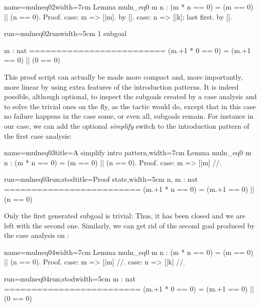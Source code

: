 \begin{coq-left}{name=mulneq02}{width=7cm}
Lemma muln_eq0 m n :
  (m * n == 0) = (m == 0) || (n == 0).
Proof.
case: m => [|m].
  by [].
case: n => [|k]; last first.
  by [].
\end{coq-left}
\begin{coqout-right}{run=mulneq02run}{width=5cm}
1 subgoal

m : nat
=========================
(m.+1 * 0 == 0) =
  (m.+1 == 0) || (0 == 0)
\end{coqout-right}

This proof script can actually be made more compact and, more
importantly, more linear by using extra features of the introduction
patterns. It is indeed possible, although optional, to
inspect the subgoals created by a case analysis and to solve the
trivial ones on the fly, as the  tactic would do, except that
in this case no failure happens in the case some, or even all,
subgoals remain. For instance in our case,
we can add the optional \C{//} \emph{simplify} switch to the
introduction pattern of the first case analysis:

\begin{coq-left}{name=mulneq03}{title=A simplify intro pattern,width=7cm}
Lemma muln_eq0 m n :
  (m * n == 0) = (m == 0) || (n == 0).
Proof.
case: m => [|m] //.
\end{coq-left}
\begin{coqout-right}{run=mulneq03run;stod}{title=Proof state,width=5cm}
n, m : nat
=========================
(m.+1 * n == 0) =
  (m.+1 == 0) || (n == 0)
\end{coqout-right}

Only the first generated subgoal is trivial: Thus, it has been closed
and we are left with the second one. Similarly, we can get rid of the
second goal produced by the case analysis on :

\begin{coq-left}{name=mulneq04}{width=7cm}
Lemma muln_eq0 m n :
  (m * n == 0) = (m == 0) || (n == 0).
Proof.
case: m => [|m] //.
case: n => [|k] //.
\end{coq-left}
\begin{coqout-right}{run=mulneq04run;stod}{width=5cm}
m : nat
=========================
(m.+1 * 0 == 0) =
  (m.+1 == 0) || (0 == 0)
\end{coqout-right}

